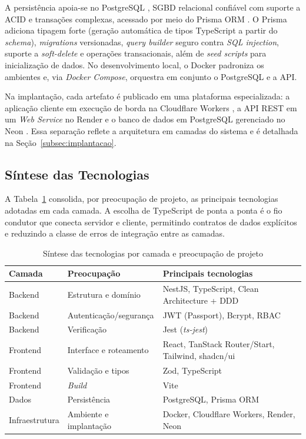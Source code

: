 \documentclass[12pt,openright,oneside,a4paper]{article}
\begin{document}
A persistência apoia-se no PostgreSQL \cite{postgresql}, SGBD relacional confiável com suporte a ACID e transações complexas, acessado por meio do Prisma ORM \cite{prisma}. O Prisma adiciona tipagem forte (geração automática de tipos TypeScript a partir do \textit{schema}), \textit{migrations} versionadas, \textit{query builder} seguro contra \textit{SQL injection}, suporte a \textit{soft-delete} e operações transacionais, além de \textit{seed scripts} para inicialização de dados. No desenvolvimento local, o Docker \cite{docker} padroniza os ambientes e, via \textit{Docker Compose}, orquestra em conjunto o PostgreSQL e a API.

Na implantação, cada artefato é publicado em uma plataforma especializada: a aplicação cliente em execução de borda na Cloudflare Workers \cite{cloudflareworkers}, a API REST em um \textit{Web Service} no Render \cite{render} e o banco de dados em PostgreSQL gerenciado no Neon \cite{neon}. Essa separação reflete a arquitetura em camadas do sistema e é detalhada na Seção~\ref{subsec:implantacao}.

\subsection{Síntese das Tecnologias}

A Tabela~\ref{tab:sintese_tecnologias} consolida, por preocupação de projeto, as principais tecnologias adotadas em cada camada. A escolha de TypeScript de ponta a ponta é o fio condutor que conecta servidor e cliente, permitindo contratos de dados explícitos e reduzindo a classe de erros de integração entre as camadas.

\begin{table}[H]
\centering
\caption{Síntese das tecnologias por camada e preocupação de projeto}
\label{tab:sintese_tecnologias}
\begin{tabularx}{\textwidth}{l l X}
\toprule
\textbf{Camada} & \textbf{Preocupação} & \textbf{Principais tecnologias} \\
\midrule
Backend       & Estrutura e domínio      & NestJS, TypeScript, Clean Architecture + DDD \\
Backend       & Autenticação/segurança   & JWT (Passport), Bcrypt, RBAC \\
Backend       & Verificação              & Jest (\textit{ts-jest}) \\
Frontend      & Interface e roteamento   & React, TanStack Router/Start, Tailwind, shadcn/ui \\
Frontend      & Validação e tipos        & Zod, TypeScript \\
Frontend      & \textit{Build}           & Vite \\
Dados         & Persistência             & PostgreSQL, Prisma ORM \\
Infraestrutura & Ambiente e implantação  & Docker, Cloudflare Workers, Render, Neon \\
\bottomrule
\end{tabularx}
\end{table}
\end{document}
